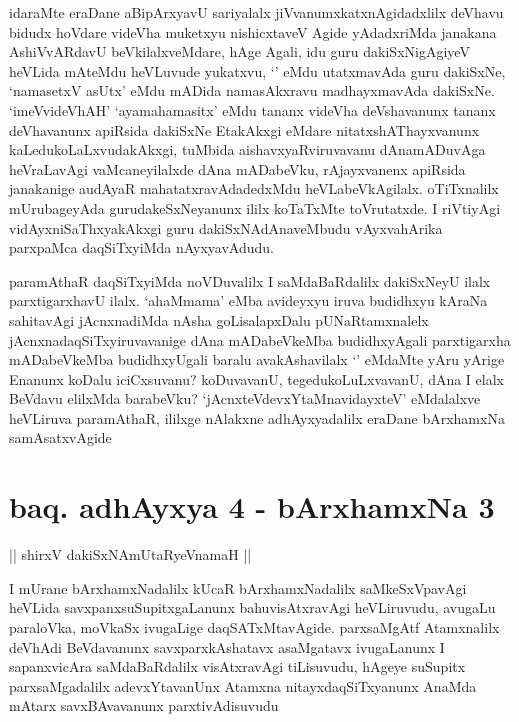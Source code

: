 \begin{artha}
idaraMte eraDane aBipArxyavU sariyalalx jiVvanumxkatxnAgidadxlilx deVhavu bidudx hoVdare videVha muketxyu nishicxtaveV Agide yAdadxriMda janakana AshiVvARdavU beVkilalxveMdare, hAge Agali, idu guru dakiSxNigAgiyeV heVLida mAteMdu heVLuvude yukatxvu, `\stext ' eMdu utatxmavAda guru dakiSxNe, `namasetxV asUtx' eMdu mADida namasAkxravu madhayxmavAda dakiSxNe. `imeVvideVhAH' `ayamahamasitx' eMdu tananx videVha deVshavanunx tananx deVhavanunx apiRsida dakiSxNe EtakAkxgi eMdare nitatxshAThayxvanunx kaLedukoLaLxvudakAkxgi, tuMbida aishavxyaRviruvavanu dAnamADuvAga heVraLavAgi vaMcaneyilalxde dAna mADabeVku, rAjayxvanenx apiRsida janakanige audAyaR mahatatxravAdadedxMdu heVLabeVkAgilalx. oTiTxnalilx mUrubageyAda gurudakeSxNeyanunx ililx koTaTxMte toVrutatxde. I riVtiyAgi vidAyxniSaThxyakAkxgi guru dakiSxNAdAnaveMbudu vAyxvahArika parxpaMca daqSiTxyiMda nAyxyavAdudu. 
\end{artha}


\begin{artha}
paramAthaR daqSiTxyiMda noVDuvalilx I saMdaBaRdalilx dakiSxNeyU ilalx parxtigarxhavU ilalx. `ahaMmama' eMba avideyxyu iruva budidhxyu kAraNa sahitavAgi jAcnxnadiMda nAsha goLisalapxDalu pUNaRtamxnalelx jAcnxnadaqSiTxyiruvavanige dAna mADabeVkeMba budidhxyAgali parxtigarxha mADabeVkeMba budidhxyUgali baralu avakAshavilalx `\stext ' eMdaMte yAru yArige Enanunx koDalu iciCxsuvanu? koDuvavanU, tegedukoLuLxvavanU, dAna I elalx BeVdavu elilxMda barabeVku? `jAcnxteVdevxYtaMnavidayxteV' eMdalalxve heVLiruva paramAthaR, ililxge nAlakxne adhAyxyadalilx eraDane bArxhamxNa samAsatxvAgide
\end{artha}

\section*{baq. adhAyxya 4 - bArxhamxNa 3}

\begin{center}%
|| shirxV dakiSxNAmUtaRyeVnamaH ||
\end{center}

\begin{artha}
I mUrane bArxhamxNadalilx kUcaR bArxhamxNadalilx saMkeSxVpavAgi heVLida savxpanxsuSupitxgaLanunx bahuvisAtxravAgi heVLiruvudu, avugaLu paraloVka, moVkaSx ivugaLige daqSATxMtavAgide. parxsaMgAtf Atamxnalilx deVhAdi BeVdavanunx savxparxkAshatavx asaMgatavx ivugaLanunx I sapanxvicAra saMdaBaRdalilx visAtxravAgi tiLisuvudu, hAgeye suSupitx parxsaMgadalilx adevxYtavanUnx Atamxna nitayxdaqSiTxyanunx AnaMda mAtarx savxBAvavanunx parxtivAdisuvudu
\end{artha}


